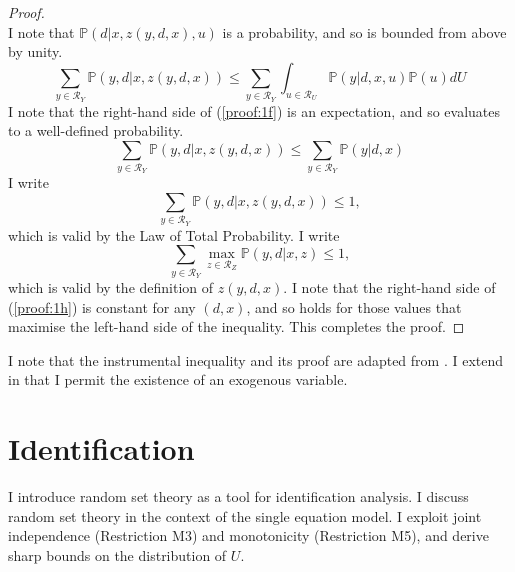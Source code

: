 \documentclass[12pt,a4paper,twoside]{article}
\numberwithin{equation}{section}
\begin{document}
\begin{proof}
\begin{equation}
\end{equation}
I note that $\mathbb{P}(d|x,z(y,d,x),u)$ is a probability, and so is bounded from above by unity.   
\begin{equation}
\sum_{y\in\mathcal{R}_Y}\mathbb{P}(y,d|x,z(y,d,x))\leq \sum_{y\in\mathcal{R}_Y}\int_{u\in\mathcal{R}_U}\mathbb{P}(y|d,x,u)\mathbb{P}(u)dU\label{proof:1f}
\end{equation}
I note that the right-hand side of (\ref{proof:1f}) is an expectation, and so evaluates to a well-defined probability.
\begin{equation}
\sum_{y\in\mathcal{R}_Y}\mathbb{P}(y,d|x,z(y,d,x))\leq \sum_{y\in\mathcal{R}_Y}\mathbb{P}(y|d,x)\label{proof:1g}
\end{equation}
I write
\begin{equation}
\sum_{y\in\mathcal{R}_Y}\mathbb{P}(y,d|x,z(y,d,x))\leq 1,\nonumber
\end{equation}
which is valid by the Law of Total Probability. I write 
\begin{equation}
\sum_{y\in\mathcal{R}_Y}\max_{z\in\mathcal{R}_Z}\mathbb{P}(y,d|x,z)\leq 1,\label{proof:1h}
\end{equation}
which is valid by the definition of $z(y,d,x)$. I note that the right-hand side of (\ref{proof:1h}) is constant for any $(d,x)$, and so holds for those values that maximise the left-hand side of the inequality. This completes the proof.
\end{proof} 
\vspace{20pt} 
\noindent I note that the instrumental inequality and its proof are adapted from \cite{p95b}. I extend \cite{p95b} in that I permit the existence of an exogenous variable. 
\section{Identification}
I introduce random set theory \citep{book.molchanov} as a tool for identification analysis. I discuss random set theory in the context of the single equation model. I exploit joint independence (Restriction M3) and monotonicity (Restriction M5), and derive sharp bounds on the distribution of $U$.
\end{document}
